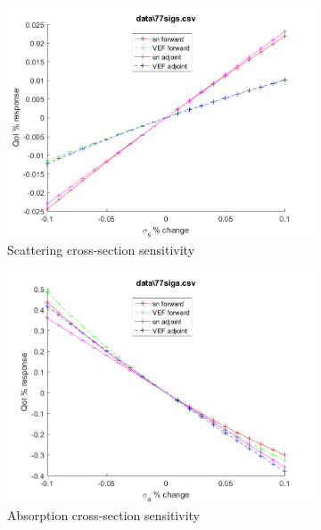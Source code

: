 \documentclass{article}
\begin{document}
\begin{figure}[H]
\begin{subfigure}{.5\textwidth}
  \includegraphics[width=.98\linewidth]{IanProposal/figures2/77sigsSens.png}
  \caption{Scattering cross-section sensitivity}
  \label{fig:sfig2}
\end{subfigure}%
\begin{subfigure}{.5\textwidth}
  \centering
  \includegraphics[width=.98\linewidth]{IanProposal/figures2/77sigaSens.png}
  \caption{Absorption cross-section sensitivity}
  \label{fig:sfig5}
\end{subfigure}%
\caption{}
\label{fig:fig}
\end{figure}
\newpage

\end{document}
